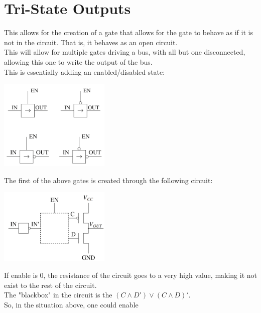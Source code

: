 \documentclass[nobib]{tufte-handout}
\begin{document}
\section{Tri-State Outputs}
    This allows for the creation of a gate that allows for the gate to behave as if it is not in the circuit. That is, it behaves as an open circuit.\\
    This will allow for multiple gates driving a bus, with all but one disconnected, allowing this one to write the output of the bus.\\
    This is essentially adding an enabled/disabled state:
    \begin{center}
        \includegraphics[width = 200px]{images/enable_gates.png}
    \end{center}
   The first of the above gates is created through the following circuit:
    \begin{center}
        \includegraphics[width = 200px]{images/enable_circuit.png}
    \end{center}
    If enable is 0, the resistance of the circuit goes to a very high value, making it not exist to the rest of the circuit.\\
    The "blackbox" in the circuit is the $(C\land D')\lor(C\land D)'$.\\
    So, in the situation above, one could enable
\end{document}
